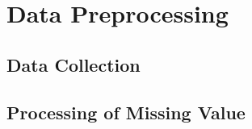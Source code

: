 
\section{Data Preprocessing}


\subsection{Data Collection}



\subsection{Processing of Missing Value}

